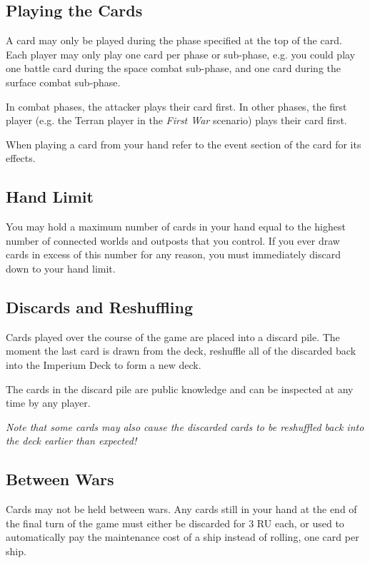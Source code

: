 \documentclass[a4paper,11pt,twocolumn]{article}
\begin{document}
\subsection{Playing the Cards}

A card may only be played during the phase specified at the top of the card. Each player may only play one card per phase or sub-phase, e.g. you could play one battle card during the space combat sub-phase, and one card during the surface combat sub-phase.

In combat phases, the attacker plays their card first. In other phases, the first player (e.g. the Terran player in the \textit{First War} scenario) plays their card first.

When playing a card from your hand refer to the event section of the card for its effects.

\subsection{Hand Limit}

You may hold a maximum number of cards in your hand equal to the highest number of connected worlds and outposts that you control. If you ever draw cards in excess of this number for any reason, you must immediately discard down to your hand limit.

\subsection{Discards and Reshuffling}

Cards played over the course of the game are placed into a discard pile. The moment the last card is drawn from the deck, reshuffle all of the discarded back into the Imperium Deck to form a new deck.

The cards in the discard pile are public knowledge and can be inspected at any time by any player.

\textit{Note that some cards may also cause the discarded cards to be reshuffled back into the deck earlier than expected!}

\subsection{Between Wars}

Cards may not be held between wars. Any cards still in your hand at the end of the final turn of the game must either be discarded for 3 RU each, or used to automatically pay the maintenance cost of a ship instead of rolling, one card per ship.
\end{document}
